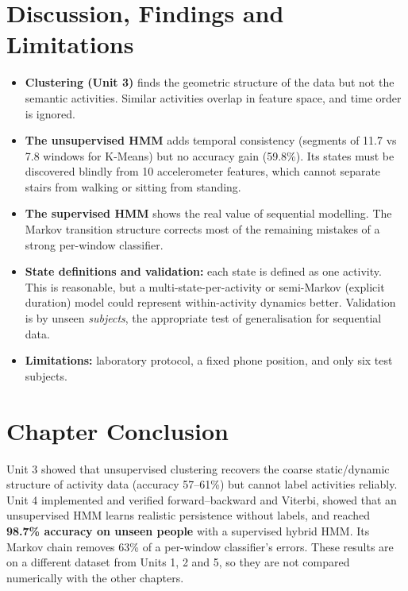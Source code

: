 \section{Discussion, Findings and Limitations}
\begin{itemize}
\item \textbf{Clustering (Unit 3)} finds the geometric structure of the data but not the semantic activities. Similar
activities overlap in feature space, and time order is ignored.
\item \textbf{The unsupervised HMM} adds temporal consistency (segments of 11.7 vs 7.8 windows for K-Means) but no
accuracy gain (59.8\%). Its states must be discovered blindly from 10 accelerometer features, which cannot separate
stairs from walking or sitting from standing.
\item \textbf{The supervised HMM} shows the real value of sequential modelling. The Markov transition structure corrects
most of the remaining mistakes of a strong per-window classifier.
\item \textbf{State definitions and validation:} each state is defined as one activity. This is reasonable, but a
multi-state-per-activity or semi-Markov (explicit duration) model could represent within-activity dynamics better.
Validation is by unseen \emph{subjects}, the appropriate test of generalisation for sequential data.
\item \textbf{Limitations:} laboratory protocol, a fixed phone position, and only six test subjects.
\end{itemize}

\section{Chapter Conclusion}
Unit 3 showed that unsupervised clustering recovers the coarse static/dynamic structure of activity data (accuracy
57–61\%) but cannot label activities reliably. Unit 4 implemented and verified forward–backward and Viterbi, showed that
an unsupervised HMM learns realistic persistence without labels, and reached \textbf{98.7\% accuracy on unseen people}
with a supervised hybrid HMM. Its Markov chain removes 63\% of a per-window classifier's errors. These results are on a
different dataset from Units 1, 2 and 5, so they are not compared numerically with the other chapters.
